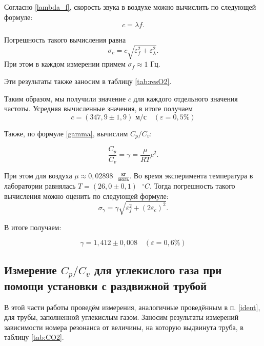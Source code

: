 \documentclass[a4paper,12pt]{article}
\theoremstyle{definition}
\begin{document}
	Согласно \eqref{lambda_f}, скорость звука в воздухе можно вычислить по следующей формуле: 
	\[ c = \lambda f. \]
	
	Погрешность такого вычисления равна \[ \sigma_c=c\sqrt{\varepsilon_f^2+\varepsilon_\lambda^2}. \] При этом в каждом измерении примем $ \sigma_f \approx 1 $ Гц.
	
	Эти результаты также заносим в таблицу \ref{tab:resO2}.
	
	Таким образом, мы получили значение $ c $ для каждого отдельного значения частоты. Усредняя вычисленные значения, в итоге получаем \[\boxed{ c = (347,9 \pm 1,9) \text{ м/с}}\quad (\varepsilon=0,5\%) \]
	
	Также, по формуле \eqref{gamma}, вычислим $ C_p/C_v $:
	
	\[ \frac{C_p}{C_v} = \gamma = \frac{\mu}{RT}c^2. \]
	
	При этом для воздуха $ \displaystyle \mu \approx 0,02898 \text{ } \frac{\text{кг}}{\text{моль}} $. Во время эксперимента температура в лаборатории равнялась $ T = (26,0 \pm 0,1) \text{ } ^\circ C $. Тогда погрешность такого вычисления можно оценить по следующей формуле:
	\[ \sigma_\gamma = \gamma\sqrt{\varepsilon_f^2+\left(2\varepsilon_c\right)^2}.\]
	
	В итоге получаем:
	
	\[ \boxed{\gamma = 1,412 \pm 0,008}\quad (\varepsilon=0,6\%) \]
	
	\subsection{Измерение $ C_p/C_v $ для углекислого газа при помощи установки с раздвижной трубой}
	
	В этой части работы проведём измерения, аналогичные проведённым в п. \ref{ident}, для трубы, заполненной углекислым газом. Заносим результаты измерений зависимости номера резонанса от величины, на которую выдвинута труба, в таблицу \ref{tab:CO2}.
\end{document}
